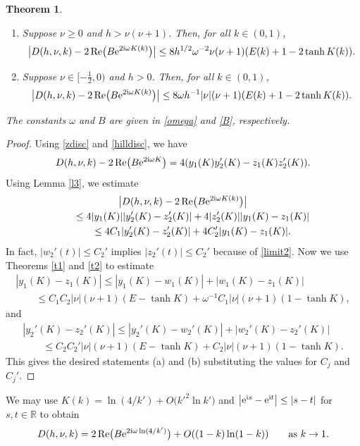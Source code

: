 \documentclass[pdftex]{sigma}
\newcommand{\R}{\mathbb{R}}
\numberwithin{equation}{section}
\newtheorem{Theorem}{Theorem}[section]
\begin{document}
\begin{Theorem}\label{t3}
\qquad
\begin{enumerate} \itemsep=0pt
\item[$(a)$] Suppose $\nu\ge 0$ and $h>\nu(\nu+1)$. Then, for all $k\in(0,1)$,
\[ \bigl|D(h,\nu,k)-2\operatorname{Re}\bigl(B {\rm e}^{2{\rm i}\omega K(k)}\bigr)\bigr|\le 8h^{1/2}\omega^{-2}\nu(\nu+1)(E(k)+1-2\tanh K(k)).\]
\item[$(b)$] Suppose $\nu\in[-\frac12,0)$ and $h>0$. Then, for all $k\in(0,1)$,
\[\bigl|D(h,\nu,k)-2\operatorname{Re}\bigl(B {\rm e}^{2{\rm i}\omega K(k)}\bigr)\bigr|
 \le 8\omega h^{-1}|\nu|(\nu+1)(E(k)+1-2\tanh K(k)) .
\]
\end{enumerate}
The constants $\omega$ and $B$ are given in \eqref{omega} and \eqref{B}, respectively.
\end{Theorem}
\begin{proof}
Using \eqref{zdisc} and \eqref{hilldisc}, we have
\[ D(h,\nu,k)-2\operatorname{Re}\bigl(B {\rm e}^{2{\rm i}\omega K}\bigr)= 4(y_1(K)y_2'(K)-z_1(K)z_2'(K)) .\]
Using Lemma \ref{l3}, we estimate
\begin{gather*}
 \bigl|D(h,\nu,k)-2\operatorname{Re}\bigl(B {\rm e}^{2{\rm i}\omega K(k)}\bigr)\bigr|\\
 \qquad \le 4|y_1(K)||y_2'(K)-z_2'(K)|+4|z_2'(K)||y_1(K)-z_1(K)|\\
 \qquad \le 4C_1|y_2'(K)-z_2'(K)|+4C_2'|y_1(K)-z_1(K)|.
\end{gather*}
In fact, $|w_2'(t)|\le C_2'$
implies $|z_2'(t)|\le C_2'$ because of \eqref{limit2}.
Now we use Theorems \ref{t1} and \ref{t2} to estimate
\begin{gather*}
|y_1(K)-z_1(K)|\le |y_1(K)-w_1(K)|+|w_1(K)-z_1(K)|\\
\qquad \le C_1C_2|\nu|(\nu+1)(E-\tanh K)+\omega^{-1}C_1|\nu|(\nu+1)(1-\tanh K),
\end{gather*}
and
\begin{gather*}
|y_2'(K)-z_2'(K)|\le |y_2'(K)-w_2'(K)|+|w_2'(K)-z_2'(K)|\\
\qquad \le C_2C_2'|\nu|(\nu+1)(E-\tanh K)+C_2|\nu|(\nu+1)(1-\tanh K).
\end{gather*}
This gives the desired statements (a) and (b) substituting the values for $C_j$ and $C_j'$.
\end{proof}

We may use $K(k)=\ln(4/k')+O\bigl(k'^2\ln k'\bigr)$ \cite[formula~(19.12.1)]{dlmf} and $\bigl|{\rm e}^{{\rm i}s}-{\rm e}^{{\rm i}t}\bigr|\le |s-t|$ for $s,t\in\R$ to
obtain
\[ D(h,\nu,k)=2\operatorname{Re}\bigl(B {\rm e}^{2{\rm i}\omega \ln(4/k')}\bigr)+O((1-k)\ln(1-k))\qquad\text{as $k\to 1$}.\]
\end{document}
